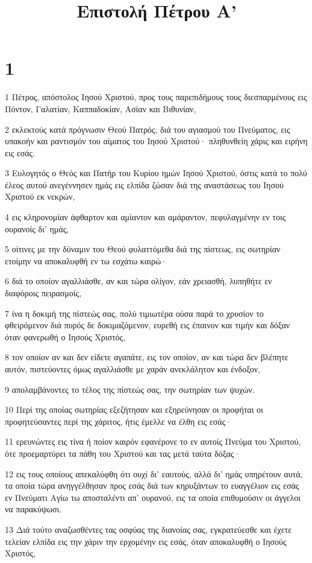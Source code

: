 

\title{Επιστολή Πέτρου Α'}


\chapter{1}

\par 1 Πέτρος, απόστολος Ιησού Χριστού, προς τους παρεπιδήμους τους διεσπαρμένους εις Πόντον, Γαλατίαν, Καππαδοκίαν, Ασίαν και Βιθυνίαν,
\par 2 εκλεκτούς κατά πρόγνωσιν Θεού Πατρός, διά του αγιασμού του Πνεύματος, εις υπακοήν και ραντισμόν του αίματος του Ιησού Χριστού· πληθυνθείη χάρις και ειρήνη εις εσάς.
\par 3 Ευλογητός ο Θεός και Πατήρ του Κυρίου ημών Ιησού Χριστού, όστις κατά το πολύ έλεος αυτού ανεγέννησεν ημάς εις ελπίδα ζώσαν διά της αναστάσεως του Ιησού Χριστού εκ νεκρών,
\par 4 εις κληρονομίαν άφθαρτον και αμίαντον και αμάραντον, πεφυλαγμένην εν τοις ουρανοίς δι' ημάς,
\par 5 οίτινες με την δύναμιν του Θεού φυλαττόμεθα διά της πίστεως, εις σωτηρίαν ετοίμην να αποκαλυφθή εν τω εσχάτω καιρώ·
\par 6 διά το οποίον αγαλλιάσθε, αν και τώρα ολίγον, εάν χρειασθή, λυπηθήτε εν διαφόροις πειρασμοίς,
\par 7 ίνα η δοκιμή της πίστεώς σας, πολύ τιμιωτέρα ούσα παρά το χρυσίον το φθειρόμενον διά πυρός δε δοκιμαζόμενον, ευρεθή εις έπαινον και τιμήν και δόξαν όταν φανερωθή ο Ιησούς Χριστός,
\par 8 τον οποίον αν και δεν είδετε αγαπάτε, εις τον οποίον, αν και τώρα δεν βλέπητε αυτόν, πιστεύοντες όμως αγαλλιάσθε με χαράν ανεκλάλητον και ένδοξον,
\par 9 απολαμβάνοντες το τέλος της πίστεώς σας, την σωτηρίαν των ψυχών.
\par 10 Περί της οποίας σωτηρίας εξεζήτησαν και εξηρεύνησαν οι προφήται οι προφητεύσαντες περί της χάριτος, ήτις έμελλε να έλθη εις εσάς·
\par 11 ερευνώντες εις τίνα ή ποίον καιρόν εφανέρονε το εν αυτοίς Πνεύμα του Χριστού, ότε προεμαρτύρει τα πάθη του Χριστού και τας μετά ταύτα δόξας·
\par 12 εις τους οποίους απεκαλύφθη ότι ουχί δι' εαυτούς, αλλά δι' ημάς υπηρέτουν αυτά, τα οποία τώρα ανηγγέλθησαν προς εσάς διά των κηρυξάντων το ευαγγέλιον εις εσάς εν Πνεύματι Αγίω τω αποσταλέντι απ' ουρανού, εις τα οποία επιθυμούσιν οι άγγελοι να παρακύψωσι.
\par 13 Διά τούτο αναζωσθέντες τας οσφύας της διανοίας σας, εγκρατεύεσθε και έχετε τελείαν ελπίδα εις την χάριν την ερχομένην εις εσάς, όταν αποκαλυφθή ο Ιησούς Χριστός,

